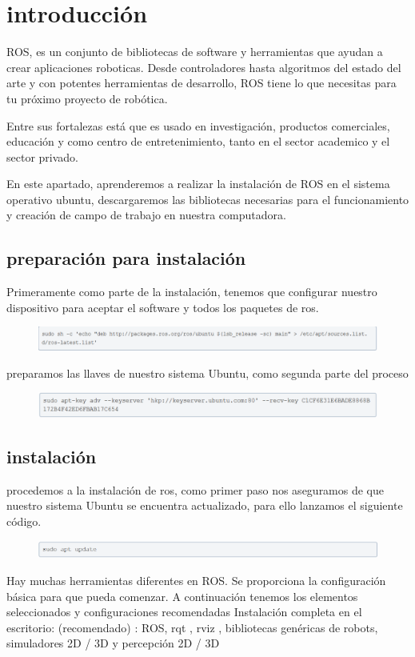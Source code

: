 \documentclass[11pt,a4paper,oldfontcommands]{memoir}
\begin{document}

\chapter{introducción}

ROS, es un conjunto de bibliotecas de software y herramientas que ayudan a crear aplicaciones roboticas. Desde controladores hasta algoritmos del estado del arte y con potentes herramientas de desarrollo, ROS tiene lo que necesitas para tu próximo proyecto de robótica. 

Entre sus fortalezas está que es usado en investigación, productos comerciales, educación y como centro de entretenimiento, tanto en el sector academico y el sector privado.

En este apartado, aprenderemos a realizar la instalación de ROS en el sistema operativo ubuntu, descargaremos las bibliotecas necesarias para el funcionamiento y creación de campo de trabajo en nuestra computadora.

\section{preparación para instalación}
Primeramente como parte de la instalación, tenemos que configurar nuestro dispositivo para aceptar el software y todos los paquetes de ros.
\begin{figure}[h]
\includegraphics[scale=.8]{link1.png}
\end{figure}

preparamos las llaves de nuestro sistema Ubuntu, como segunda parte del proceso
\begin{figure}[h]
\includegraphics[scale=.8]{link11.png}
\end{figure}

\section{instalación}
procedemos a la instalación de ros, como primer paso nos aseguramos de que nuestro sistema Ubuntu se encuentra actualizado, para ello lanzamos el siguiente código.
\begin{figure}[h]
\includegraphics[scale=.8]{link20.png}
\end{figure}
Hay muchas herramientas diferentes en ROS. Se proporciona la configuración básica para que pueda comenzar. 
A continuación tenemos los elementos seleccionados y configuraciones recomendadas
Instalación completa en el escritorio: (recomendado) : ROS, rqt , rviz , bibliotecas genéricas de robots, simuladores 2D / 3D y percepción 2D / 3D
\end{document}
